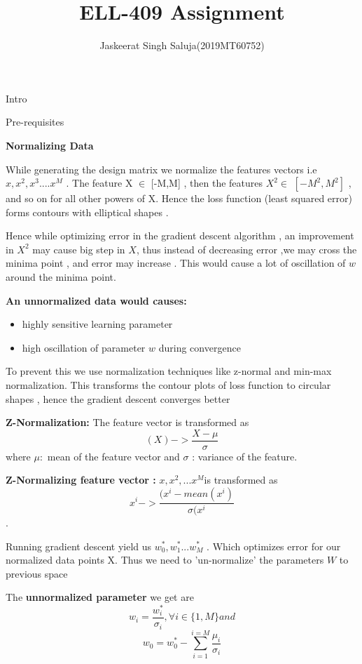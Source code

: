 \documentclass[11pt]{beamer}
\author{Jaskeerat Singh Saluja(2019MT60752)}
\title{ELL-409 Assignment}
\begin{document}
\begin{frame}
\titlepage
\end{frame}





\begin{frame}{Intro}
\begin{huge}
Pre-requisites
\end{huge} 
\end{frame}


\begin{frame}
\textbf{Normalizing Data}

While generating the design matrix we  normalize the features vectors i.e $x,x^2,x^3....x^M$ .
The feature X $\in$ [-M,M] , then the features $X^2 \in$ $[-M^2,M^2]$ , and so on for all other powers of X. 
Hence the loss function (least squared error) forms contours with elliptical shapes . 

Hence while optimizing error in the gradient descent algorithm , an improvement in $X^2$ may cause big step in $X$, thus instead of decreasing error ,we may cross the minima point , and error may increase . This would cause a lot of oscillation of $w$ around the minima point.

\textbf{An unnormalized data would causes:}
\begin{itemize}
\item highly sensitive learning parameter
\item high oscillation of parameter $w$ during convergence

\end{itemize}


To prevent this we use normalization techniques like z-normal and min-max normalization. This transforms the contour plots of loss function to circular shapes , hence the gradient descent converges better
\end{frame}

\begin{frame}
\textbf{Z-Normalization:} The feature vector is transformed as  $$(X) -> \frac{X-\mu}{\sigma}$$
where $\mu :$ mean of the feature vector and $\sigma$ : variance of the feature.

\textbf{Z-Normalizing feature vector :} {$x,x^2,... x^M$}is transformed as  $$x^i -> \frac{(x^i-mean(x^i)}{\sigma(x^i}$$.

Running gradient descent yield us $w_0^* ,w_1^* ... w_M^*$ . Which optimizes error for our normalized data points X. Thus we need to 'un-normalize' the parameters $W$ to previous space

The \textbf{unnormalized parameter} we get are $$w_i = \frac{w_i^*}{\sigma_i} , \forall i \in \{1,M\} and $$
$$w_0 = w_0^* - \sum_{i=1}^{i=M} {\frac{\mu_i}{\sigma_i}}$$
\end{frame}
\end{document}
